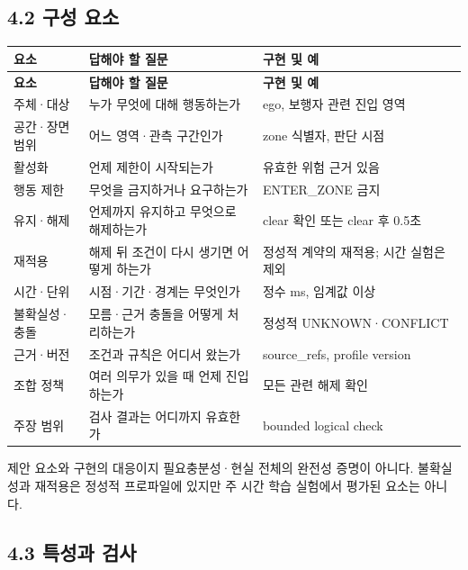 \documentclass[11pt,a4paper]{article}
\begin{document}
\subsection*{4.2 구성 요소}

\begingroup\small
\begin{longtable}{@{}>{\raggedright\arraybackslash}p{}>{\raggedright\arraybackslash}p{}>{\raggedright\arraybackslash}p{}@{}}
\toprule
\textbf{요소} & \textbf{답해야 할 질문} & \textbf{구현 및 예} \\
\midrule\endfirsthead
\toprule
\textbf{요소} & \textbf{답해야 할 질문} & \textbf{구현 및 예} \\
\midrule\endhead
\bottomrule\endfoot
주체·대상 & 누가 무엇에 대해 행동하는가 & ego, 보행자 관련 진입 영역 \\
공간·장면 범위 & 어느 영역·관측 구간인가 & zone 식별자, 판단 시점 \\
활성화 & 언제 제한이 시작되는가 & 유효한 위험 근거 있음 \\
행동 제한 & 무엇을 금지하거나 요구하는가 & ENTER\_\allowbreak{}ZONE 금지 \\
유지·해제 & 언제까지 유지하고 무엇으로 해제하는가 & clear 확인 또는 clear 후 0.5초 \\
재적용 & 해제 뒤 조건이 다시 생기면 어떻게 하는가 & 정성적 계약의 재적용; 시간 실험은 제외 \\
시간·단위 & 시점·기간·경계는 무엇인가 & 정수 ms, 임계값 이상 \\
불확실성·충돌 & 모름·근거 충돌을 어떻게 처리하는가 & 정성적 UNKNOWN·CONFLICT \\
근거·버전 & 조건과 규칙은 어디서 왔는가 & source\_\allowbreak{}refs, profile version \\
조합 정책 & 여러 의무가 있을 때 언제 진입하는가 & 모든 관련 해제 확인 \\
주장 범위 & 검사 결과는 어디까지 유효한가 & bounded logical check \\
\end{longtable}
\endgroup

제안 요소와 구현의 대응이지 필요충분성·현실 전체의 완전성 증명이 아니다. 불확실성과 재적용은 정성적 프로파일에 있지만 주 시간 학습 실험에서 평가된 요소는 아니다.\par

\subsection*{4.3 특성과 검사}
\end{document}
